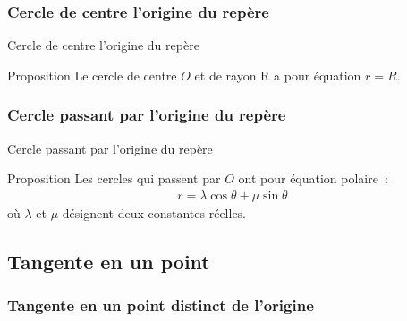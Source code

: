 \documentclass[14pt]{beamer}
\begin{document}
\subsubsection{Cercle de centre l'origine du repère}
\begin{frame}{Cercle de centre l'origine du repère}
        \begin{alertblock}{Proposition}
                Le cercle de centre $O$ et de rayon R a pour équation $r=R$.
        \end{alertblock}
\end{frame}
\subsubsection{Cercle passant par l'origine du repère}
\begin{frame}{Cercle passant par l'origine du repère}
        \begin{alertblock}{Proposition}
                Les cercles qui passent par $O$
                ont pour équation polaire~:
                \begin{align*}
                        r=\lambda\cos\theta+\mu\sin\theta
                \end{align*}
                où $\lambda$ et $\mu$ désignent deux constantes réelles.
        \end{alertblock}
\end{frame}

\subsection{Tangente en un point}
\subsubsection{Tangente en un point distinct de l'origine}
\end{document}
